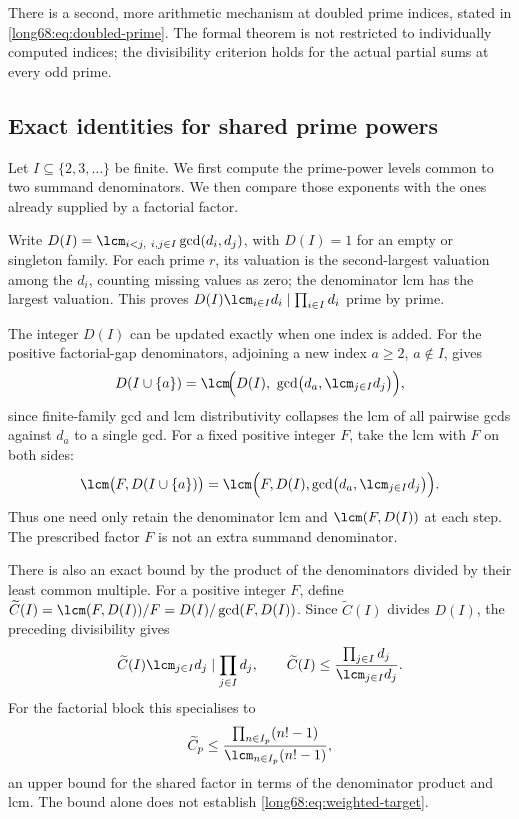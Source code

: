 There is a second, more arithmetic mechanism at doubled prime indices, stated
in \eqref{long68:eq:doubled-prime}.  The formal theorem is not
restricted to individually computed indices; the divisibility criterion
holds for the actual partial sums at every odd prime.

\subsection{Exact identities for shared prime powers}\label{long68:sec:ext-collision}

Let $I\subseteq\{2,3,\ldots\}$ be finite. We first compute the
prime-power levels common to two summand denominators. We then compare
those exponents with the ones already supplied by a factorial factor.

Write $D(I)=\lcm_{i<j,\ i,j\in I}\gcd(d_i,d_j)$, with $D(I)=1$
for an empty or singleton family. For each prime $r$, its valuation is the
second-largest valuation among the $d_i$, counting missing values as zero;
the denominator lcm has the largest valuation. This proves
$D(I)\lcm_{i\in I}d_i\mid\prod_{i\in I}d_i$ prime by prime.

The integer $D(I)$ can be updated exactly when one index is added. For the positive
factorial-gap denominators, adjoining a new index $a\ge2$, $a\notin I$, gives
\[
 D(I\cup\{a\})=\lcm\!\Bigl(D(I),\ \gcd\bigl(d_a,\lcm_{j\in I}d_j\bigr)\Bigr),
\]
since finite-family gcd and lcm distributivity collapses the lcm of all
pairwise gcds against $d_a$ to a single gcd. For a fixed positive integer
$F$, take the lcm with $F$ on both sides:
\[
 \lcm\bigl(F,D(I\cup\{a\})\bigr)
 =\lcm\Bigl(F,D(I),\gcd\bigl(d_a,\lcm_{j\in I}d_j\bigr)\Bigr).
\]
Thus one need only retain the denominator lcm and $\lcm(F,D(I))$ at each
step. The prescribed factor $F$ is not an extra summand denominator.

There is also an exact bound by the product of the denominators divided
by their least common multiple. For a positive integer $F$, define
$\widetilde C(I)=\lcm(F,D(I))/F=D(I)/\gcd(F,D(I))$. Since
$\widetilde C(I)$ divides $D(I)$, the preceding divisibility gives
\[
 \widetilde C(I)\lcm_{j\in I}d_j\mid\prod_{j\in I}d_j,\qquad
 \widetilde C(I)\le\frac{\prod_{j\in I}d_j}{\lcm_{j\in I}d_j}.
\]  For the factorial block this specialises to
\[
 \widetilde C_p\le\frac{\prod_{n\in I_p}(n!-1)}{\lcm_{n\in I_p}(n!-1)},
\]
an upper bound for the shared factor in terms of the denominator product
and lcm. The bound alone does not establish
\eqref{long68:eq:weighted-target}.

